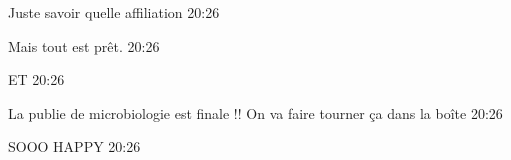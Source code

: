     \begin{leftbubbles} Juste savoir quelle affiliation \hspace{0.5cm}\hfill{\textcolor{mygray}{{\footnotesize 20:26}}} \end{leftbubbles}\vspace*{-0.6cm}  
    \begin{leftbubbles} Mais tout est prêt. \hspace{0.5cm}\hfill{\textcolor{mygray}{{\footnotesize 20:26}}} \end{leftbubbles}\vspace*{-0.6cm}  
    \begin{leftbubbles} ET \hspace{0.5cm}\hfill{\textcolor{mygray}{{\footnotesize 20:26}}} \end{leftbubbles}\vspace*{-0.6cm}  
    \begin{leftbubbles} La publie de microbiologie est finale !! On va faire tourner ça dans la boîte \hspace{0.5cm}\hfill{\textcolor{mygray}{{\footnotesize 20:26}}} \end{leftbubbles}\vspace*{-0.6cm}  
    \begin{leftbubbles} SOOO HAPPY \hspace{0.5cm}\hfill{\textcolor{mygray}{{\footnotesize 20:26}}} \end{leftbubbles}\vspace*{-0.6cm}  